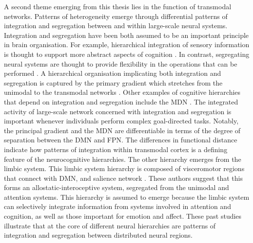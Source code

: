 A second theme emerging from this thesis lies in the function of transmodal networks. Patterns of heterogeneity emerge through differential patterns of integration and segregation between and within large-scale neural systems. Integration and segregation have been both assumed to be an important principle in brain organisation.
For example, hierarchical integration of sensory information is thought to support more abstract aspects of cognition \cite{Mesulam1998}. In contrast, segregating neural systems are thought to provide flexibility in the operations that can be performed \cite{Buckner2013}. A hierarchical organisation implicating both integration and segregation is captured by the primary gradient which stretches from the unimodal to the transmodal networks \cite{Margulies2016}.
Other examples of cognitive hierarchies that depend on integration and segregation include the MDN \cite{Duncan2010}. The integrated activity of large-scale network concerned with integration and segregation is important whenever individuals perform complex goal-directed tasks.  Notably, the principal gradient and the MDN are differentiable in terms of the degree of separation between the DMN and FPN. The differences in functional distance indicate how patterns of integration within transmodal cortex is a defining feature of the neurocognitive hierarchies.
The other hierarchy emerges from the limbic system. This limbic system hierarchy is composed of visceromotor regions that connect with DMN, and salience network \cite{Kleckner2017}. These authors suggest that this forms an allostatic-interoceptive system, segregated from the unimodal and attention systems. This hierarchy is assumed to emerge because the limbic system can selectively integrate information from systems involved in attention and cognition, as well as those important for emotion and affect.
These past studies illustrate that at the core of different neural hierarchies are patterns of integration and segregation between distributed neural regions.

